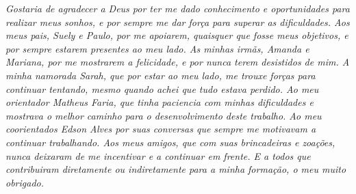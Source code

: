 \begin{agradecimentos}
\textit{
	Gostaria de agradecer a Deus por ter me dado conhecimento e oportunidades para realizar meus sonhos, e por sempre me dar força para superar as dificuldades. Aos meus pais, Suely e Paulo, por me apoiarem, quaisquer que fosse meus objetivos, e por sempre estarem presentes ao meu lado. As minhas irmãs, Amanda e Mariana, por me mostrarem a felicidade, e por nunca terem desistidos de mim. A minha namorada Sarah, que por estar ao meu lado, me trouxe forças para continuar tentando, mesmo quando achei que tudo estava perdido. Ao meu orientador Matheus Faria, que tinha paciencia com minhas dificuldades e mostrava o melhor caminho para o desenvolvimento deste trabalho. Ao meu coorientados Edson Alves por suas conversas que sempre me motivavam a continuar trabalhando. Aos meus amigos, que com suas brincadeiras e zoações, nunca deixaram de me incentivar e a continuar em frente. E a todos que contribuiram diretamente ou indiretamente para a minha formação, o meu muito obrigado. 
}
\end{agradecimentos}